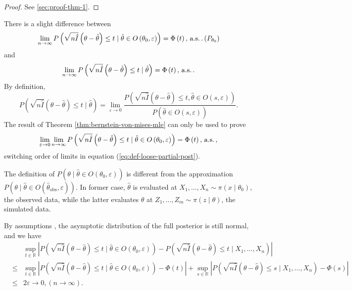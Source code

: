 \begin{proof}
See  \ref{sec:proof-thm-1}.\end{proof}
\begin{rem}
There is a slight difference between 
\[
\lim_{n\rightarrow\infty}P\left(\sqrt{n\hat{I}}\left(\theta-\hat{\theta}\right)\le t\mid\hat{\theta}\in O\left(\theta_{0},\varepsilon\right)\right)=\Phi\left(t\right),\,\mathrm{a.s.}\,.\left(P_{\theta_{0}}\right)
\]
and 
\[
\lim_{n\rightarrow\infty}P\left(\sqrt{n\hat{I}}\left(\theta-\hat{\theta}\right)\le t\mid\hat{\theta}\right)=\Phi\left(t\right),\,\mathrm{a.s.}\,.
\]
By definition, 
\begin{equation}
P\left(\sqrt{n\hat{I}}\left(\theta-\hat{\theta}\right)\le t\mid\hat{\theta}\right)=\lim_{\varepsilon\rightarrow0}\frac{P\left(\sqrt{n\hat{I}}\left(\theta-\hat{\theta}\right)\le t,\hat{\theta}\in O\left(s,\varepsilon\right)\right)}{P\left(\hat{\theta}\in O\left(s,\varepsilon\right)\right)}.\label{eq:def-loose-partial-post}
\end{equation}
The result of Theorem \ref{thm:bernstein-von-mises-mle} can only
be used to prove 
\[
\lim_{\varepsilon\rightarrow0}\lim_{n\rightarrow\infty}P\left(\sqrt{n\hat{I}}\left(\theta-\hat{\theta}\right)\le t\mid\hat{\theta}\in O\left(\theta_{0},\varepsilon\right)\right)=\Phi\left(t\right),\,\mathrm{a.s.}\,,
\]
switching order of limits in equation (\ref{eq:def-loose-partial-post}). 
\begin{rem}
The definition of $P\left(\theta\mid\hat{\theta}\in O\left(\theta_{0},\varepsilon\right)\right)$
is different from the approximation $P\left(\theta\mid\hat{\theta}\in O\left(\hat{\theta}_{\mathrm{obs}},\varepsilon\right)\right)$.
In former case, $\hat{\theta}$ is evaluated at $X_{1},\ldots,X_{n}\sim\pi\left(x\mid\theta_{0}\right)$,
the observed data, while the latter evaluates $\hat{\theta}$ at $Z_{1},\ldots,Z_{m}\sim\pi\left(z\mid\theta\right)$,
the simulated data. 
\end{rem}
\end{rem}
By {assumptions }, the asymptotic
distribution of the full posterior is still normal, and we have 
\begin{eqnarray*}
 &  & \sup_{t\in\mathbb{R}}\left|P\left(\sqrt{n\hat{I}}\left(\theta-\hat{\theta}\right)\le t\mid\hat{\theta}\in O\left(\theta_{0},\varepsilon\right)\right)-P\left(\sqrt{n\hat{I}}\left(\theta-\hat{\theta}\right)\le t\mid X_{1},\ldots,X_{n}\right)\right|\\
 & \le & \sup_{t\in\mathbb{R}}\left|P\left(\sqrt{n\hat{I}}\left(\theta-\hat{\theta}\right)\le t\mid\hat{\theta}\in O\left(\theta_{0},\varepsilon\right)\right)-\Phi\left(t\right)\right|+\sup_{s\in\mathbb{R}}\left|P\left(\sqrt{n\hat{I}}\left(\theta-\hat{\theta}\right)\le s\mid X_{1},\ldots,X_{n}\right)-\Phi\left(s\right)\right|\\
 & \le & 2\varepsilon\rightarrow0,\left(n\rightarrow\infty\right).
\end{eqnarray*}
